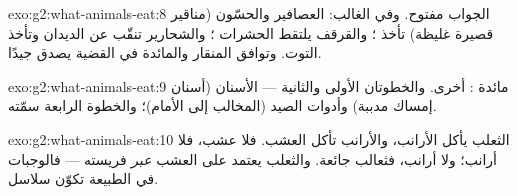 \begin{solution}{exo:g2:what-animals-eat:8}
الجواب مفتوح. وفي الغالب: العصافير والحسّون (مناقير قصيرة غليظة)
تأخذ ؛ والقرقف يلتقط الحشرات ؛ والشحارير تنقّب عن
الديدان وتأخذ التوت. وتوافق المنقار والمائدة في القضية يصدق جيدًا.
\end{solution}

\begin{solution}{exo:g2:what-animals-eat:9}
مائدة :  أخرى. والخطوتان الأولى والثانية --- الأسنان
(أسنان إمساك مدببة) وأدوات الصيد (المخالب  إلى الأمام)؛
والخطوة الرابعة سمّته.
\end{solution}

\begin{solution}{exo:g2:what-animals-eat:10}
الثعلب يأكل الأرانب، والأرانب تأكل العشب. فلا عشب، فلا أرانب؛ ولا
أرانب، فثعالب جائعة. والثعلب يعتمد على العشب \emph{عبر} فريسته ---
فالوجبات في الطبيعة تكوّن سلاسل.
\end{solution}
